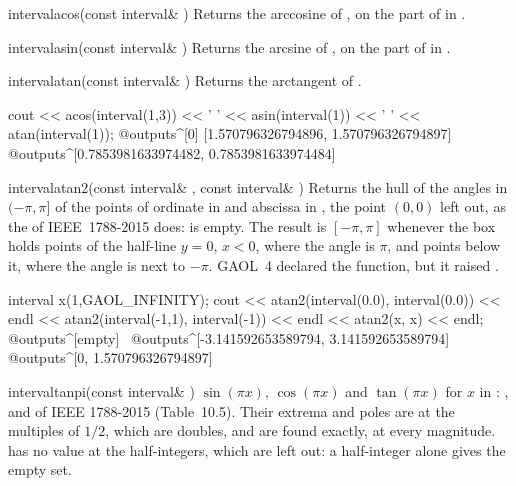 \begin{deffun}{interval}{acos}{(const interval\& )}
  Returns the arccosine of , on the part of  in .
\end{deffun}

\begin{deffun}{interval}{asin}{(const interval\& )}
  Returns the arcsine of , on the part of  in .
\end{deffun}

\begin{deffun}{interval}{atan}{(const interval\& )}
  Returns the arctangent of .
\begin{example}
cout << acos(interval(1,3)) << ' ' << asin(interval(1)) << ' '
     << atan(interval(1));
@outputs^[0] [1.570796326794896, 1.570796326794897]~
@outputs^[0.7853981633974482, 0.7853981633974484]~
\end{example}
\end{deffun}

\begin{deffun}{interval}{atan2}{(const interval\& , const interval\& )}
  Returns the hull of the angles in $(-\pi,\pi]$ of the points of ordinate
  in  and abscissa in , the point $(0,0)$ left out, as the
   of IEEE~1788-2015 does:  is empty. The
  result is $[-\pi,\pi]$ whenever the box holds points of the half-line
  $y=0$, $x<0$, where the angle is $\pi$, and points below it, where the
  angle is next to $-\pi$. GAOL~4 declared the function, but it raised
  .\newinvfive
\begin{example}
interval x(1,GAOL_INFINITY);
cout << atan2(interval(0.0), interval(0.0)) << endl
     << atan2(interval(-1,1), interval(-1)) << endl
     << atan2(x, x) << endl;
@outputs^[empty]~
@outputs^[-3.141592653589794, 3.141592653589794]~
@outputs^[0, 1.570796326794897]~
\end{example}
\end{deffun}

\begin{deffun}{interval}{tanpi}{(const interval\& )}
  $\sin(\pi x)$, $\cos(\pi x)$ and $\tan(\pi x)$ for $x$ in :
  ,  and  of IEEE 1788-2015
  (Table~10.5).\newinvfive{} Their extrema and poles are at the multiples of
  $1/2$, which are doubles, and are found exactly, at every magnitude.
   has no value at the half-integers, which are left out: a
  half-integer alone gives the empty set.
\end{deffun}


